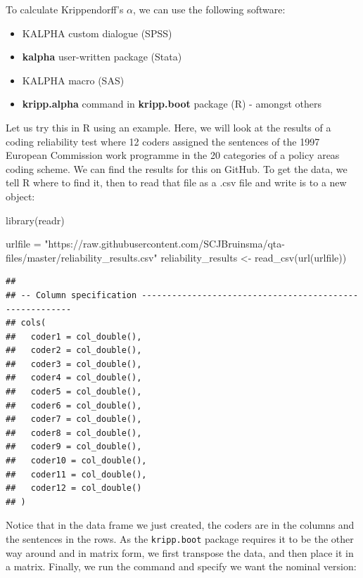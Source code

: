 \documentclass[
]{book}
\newenvironment{Shaded}{\begin{snugshade}}{\end{snugshade}}
\newcommand{\FunctionTok}[1]{\textcolor[rgb]{0.00,0.00,0.00}{#1}}
\newcommand{\NormalTok}[1]{#1}
\newcommand{\OtherTok}[1]{\textcolor[rgb]{0.56,0.35,0.01}{#1}}
\newcommand{\StringTok}[1]{\textcolor[rgb]{0.31,0.60,0.02}{#1}}
\providecommand{\tightlist}{%
  \setlength{\itemsep}{0pt}\setlength{\parskip}{0pt}}
\begin{document}
To calculate Krippendorff's \(\alpha\), we can use the following software:

\begin{itemize}
\tightlist
\item
  KALPHA custom dialogue (SPSS)
\item
  \textbf{kalpha} user-written package (Stata)
\item
  KALPHA macro (SAS)
\item
  \textbf{kripp.alpha} command in \textbf{kripp.boot} package (R) - amongst others
\end{itemize}

Let us try this in R using an example. Here, we will look at the results of a coding reliability test where 12 coders assigned the sentences of the 1997 European Commission work programme in the 20 categories of a policy areas coding scheme. We can find the results for this on GitHub. To get the data, we tell R where to find it, then to read that file as a .csv file and write is to a new object:

\begin{Shaded}
\begin{Highlighting}[]
\FunctionTok{library}\NormalTok{(readr)}

\NormalTok{urlfile }\OtherTok{=} \StringTok{"https://raw.githubusercontent.com/SCJBruinsma/qta{-}files/master/reliability\_results.csv"}
\NormalTok{reliability\_results }\OtherTok{\textless{}{-}} \FunctionTok{read\_csv}\NormalTok{(}\FunctionTok{url}\NormalTok{(urlfile))}
\end{Highlighting}
\end{Shaded}

\begin{verbatim}
## 
## -- Column specification --------------------------------------------------------
## cols(
##   coder1 = col_double(),
##   coder2 = col_double(),
##   coder3 = col_double(),
##   coder4 = col_double(),
##   coder5 = col_double(),
##   coder6 = col_double(),
##   coder7 = col_double(),
##   coder8 = col_double(),
##   coder9 = col_double(),
##   coder10 = col_double(),
##   coder11 = col_double(),
##   coder12 = col_double()
## )
\end{verbatim}

Notice that in the data frame we just created, the coders are in the columns and the sentences in the rows. As the \texttt{kripp.boot} package requires it to be the other way around and in matrix form, we first transpose the data, and then place it in a matrix. Finally, we run the command and specify we want the nominal version:
\end{document}
